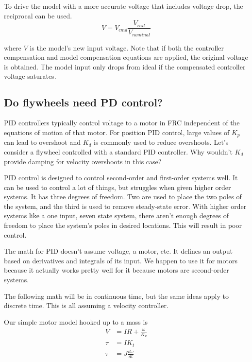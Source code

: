 To drive the \gls{model} with a more accurate voltage that includes voltage
drop, the reciprocal can be used.
\begin{equation}
  V = V_{cmd} \frac{V_{rail}}{V_{nominal}}
\end{equation}

where $V$ is the \gls{model}'s new input voltage. Note that if both the
\gls{controller} compensation and \gls{model} compensation equations are
applied, the original voltage is obtained. The \gls{model} input only drops from
ideal if the compensated \gls{controller} voltage saturates.

\subsection{Do flywheels need PD control?}

PID controllers typically control voltage to a motor in FRC independent of the
equations of motion of that motor. For position PID control, large values of
$K_p$ can lead to overshoot and $K_d$ is commonly used to reduce overshoots.
Let's consider a flywheel controlled with a standard PID controller. Why
wouldn't $K_d$ provide damping for velocity overshoots in this case?

PID control is designed to control second-order and first-order \glspl{system}
well. It can be used to control a lot of things, but struggles when given higher
order \glspl{system}. It has three degrees of freedom. Two are used to place the
two poles of the \gls{system}, and the third is used to remove steady-state
error. With higher order \glspl{system} like a one input, seven \gls{state}
\gls{system}, there aren't enough degrees of freedom to place the \gls{system}'s
poles in desired locations. This will result in poor control.

The math for PID doesn't assume voltage, a motor, etc. It defines an output
based on derivatives and integrals of its input. We happen to use it for motors
because it actually works pretty well for it because motors are second-order
\glspl{system}.

The following math will be in continuous time, but the same ideas apply to
discrete time. This is all assuming a velocity controller.

Our simple motor model hooked up to a mass is
\begin{align}
  V &= IR + \frac{\omega}{K_v} \label{eq:steady-state_error_ss_flywheel_1} \\
  \tau &= I K_t \label{eq:steady-state_error_ss_flywheel_2} \\
  \tau &= J \frac{d\omega}{dt} \label{eq:steady-state_error_ss_flywheel_3}
\end{align}

